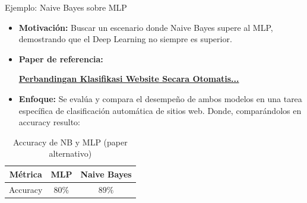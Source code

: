 \documentclass{beamer}
\begin{document}
\begin{frame}{Ejemplo: Naive Bayes sobre MLP}
    \begin{itemize}
        \item \textbf{Motivación:} Buscar un escenario donde Naive Bayes supere al MLP, demostrando que el Deep Learning no siempre es superior.
        
        \item \textbf{Paper de referencia:} 
        \begin{center}
            \href{https://ejurnal.stmik-budidarma.ac.id/index.php/JSON/article/view/2703/1899}{\textbf{Perbandingan Klasifikasi Website Secara Otomatis...}}
        \end{center}
        
        \item \textbf{Enfoque:} Se evalúa y compara el desempeño de ambos modelos en una tarea específica de clasificación automática de sitios web. Donde, comparándolos en accuracy resulto:
    \end{itemize}

    \begin{table}[]
        \centering
        \begin{tabular}{|c|c|c|}
           \hline
           Métrica  & MLP & Naive Bayes \\
           \hline
           Accuracy & $80\%$ & $89\%$ \\
           \hline
        \end{tabular}
        \caption{Accuracy de NB y MLP (paper alternativo)}
        \label{tab:accuracypaperalt}
    \end{table}
\end{frame}
\end{document}
